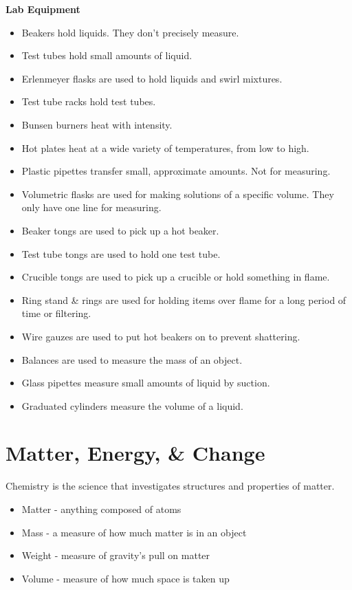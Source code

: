 \documentclass[../hchem.tex]{subfiles}
\begin{document}
\textbf{Lab Equipment} 
\begin{itemize}
    \item Beakers hold liquids. They don't precisely measure.
    \item Test tubes hold small amounts of liquid.
    \item Erlenmeyer flasks are used to hold liquids and swirl mixtures.
    \item Test tube racks hold test tubes.
    \item Bunsen burners heat with intensity.
    \item Hot plates heat at a wide variety of temperatures, from low to high.
    \item Plastic pipettes transfer small, approximate amounts. Not for measuring.
    \item Volumetric flasks are used for making solutions of a specific volume. They only have one line for measuring.
    \item Beaker tongs are used to pick up a hot beaker.
    \item Test tube tongs are used to hold one test tube.
    \item Crucible tongs are used to pick up a crucible or hold something in flame.
    \item Ring stand \& rings are used for holding items over flame for a long period of time or filtering.
    \item Wire gauzes are used to put hot beakers on to prevent shattering.
    \item Balances are used to measure the mass of an object.
    \item Glass pipettes measure small amounts of liquid by suction.
    \item Graduated cylinders measure the volume of a liquid.
\end{itemize}


\section{Matter, Energy, \& Change}
Chemistry is the science that investigates structures and properties of matter.
\begin{itemize}
    \item Matter - anything composed of atoms
    \item Mass - a measure of how much matter is in an object 
    \item Weight - measure of gravity's pull on matter 
    \item Volume - measure of how much space is taken up
\end{itemize}
\end{document}
